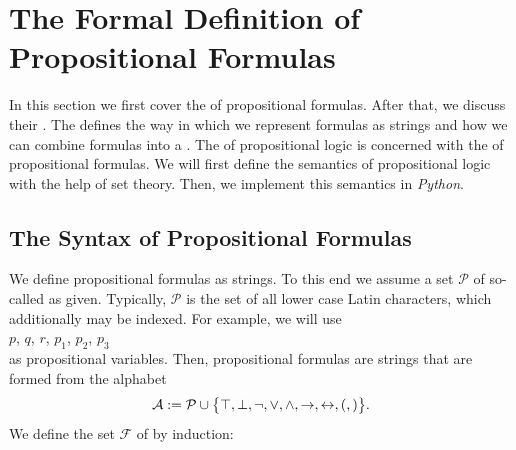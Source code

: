 \section{The Formal Definition of Propositional Formulas}
In this section we first cover the  of propositional formulas.  After that, we discuss their
. The   defines the way in which we represent formulas as strings
and how we can combine formulas into a .  The   of propositional
logic is concerned with the   of propositional formulas.
We will first define the semantics of propositional logic with the help of set theory.
Then, we implement this semantics in \textsl{Python}.

\subsection{The Syntax of Propositional Formulas}
We define propositional formulas as strings.  To this end we assume a set  $\mathcal{P}$  
of so-called  as given. 
Typically, $\mathcal{P}$ is the set of all lower case Latin characters, which additionally may be indexed.
For example, we will use 
\\[0.2cm]
\hspace*{1.3cm}
$p$, $q$, $r$, $p_1$, $p_2$, $p_3$
\\[0.2cm]
as propositional variables.  Then, propositional formulas are strings that are formed from the alphabet
$$ 
  \mathcal{A} := \mathcal{P} \cup \bigl\{ \top, \bot, \neg, \vee, \wedge,
   \rightarrow, \leftrightarrow, (, ) \bigr\}.
$$
We define the set $\mathcal{F}$ of 
by induction:
